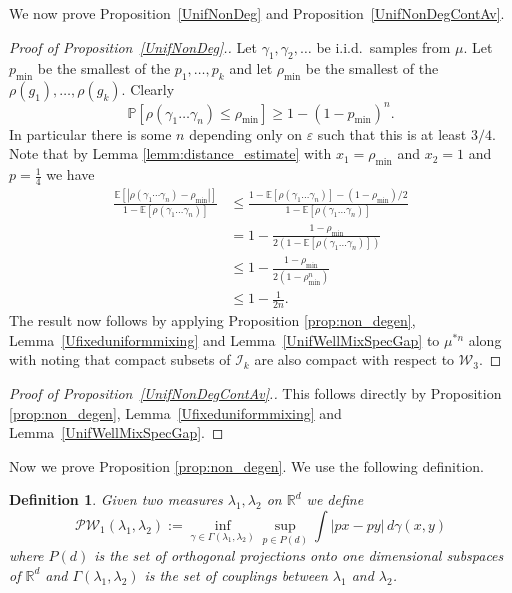 \documentclass[10pt, english,oneside,reqno]{amsart}
\theoremstyle{plain}
\newtheorem{definition}[theorem]{Definition}
\theoremstyle{remark}
\numberwithin{equation}{section}
\numberwithin{figure}{section}
\newcommand{\eps}{\varepsilon}
\newcommand{\R}{\mathbb{R}}
\begin{document}
We now prove Proposition~\ref{UnifNonDeg} and Proposition~\ref{UnifNonDegContAv}.

\begin{proof}[Proof of Proposition~\ref{UnifNonDeg}.]
	Let $\gamma_1, \gamma_2, \dots$ be i.i.d.\ samples from $\mu$. Let $p_{\text{min}}$ be the smallest of the $p_1, \dots, p_k$ and let $\rho_{\text{min}}$ be the smallest of the $\rho(g_1), \dots, \rho(g_k)$. Clearly
	\begin{equation*}
		\mathbb{P}[\rho(\gamma_1 \dots \gamma_n) \leq \rho_{\text{min}}] \geq 1 - (1 - p_{\text{min}})^n.
	\end{equation*}
	In particular there is some $n$ depending only on $\eps$ such that this is at least $3/4$. Note that by Lemma \ref{lemm:distance_estimate} with $x_1 = \rho_{\min}$ and $x_2 = 1$ and $p = \frac{1}{4}$ we have
	\begin{align*}
		\frac{\mathbb{E}[|\rho(\gamma_1 \cdots \gamma_n) - \rho_{\text{min}} |]}{1 - \mathbb{E}[\rho(\gamma_1 \dots \gamma_n)]} &\leq \frac{1 - \mathbb{E}[\rho(\gamma_1 \dots \gamma_n)] - (1 - \rho_{\text{min}}) / 2}{1 - \mathbb{E}[\rho(\gamma_1 \dots \gamma_n)]}\\
		&= 1 - \frac{1 - \rho_{\text{min}}}{2 (1 - \mathbb{E}[\rho(\gamma_1 \dots \gamma_n)])}\\
		& \leq 1 - \frac{1 - \rho_{\text{min}}}{2  (1 - \rho_{\text{min}}^n)} \\
		& \leq 1 - \frac{1}{2n}.
	\end{align*} The result now follows by applying Proposition \ref{prop:non_degen}, Lemma~\ref{Ufixeduniformmixing} and Lemma~\ref{UnifWellMixSpecGap} to $\mu^{*n}$ along with noting that compact subsets of $\mathcal{I}_k$ are also compact with respect to $\mathcal{W}_3$. 
\end{proof}

\begin{proof}[Proof of Proposition~\ref{UnifNonDegContAv}.]
	This follows directly by Proposition \ref{prop:non_degen}, Lemma~\ref{Ufixeduniformmixing} and Lemma~\ref{UnifWellMixSpecGap}.
\end{proof}

Now we prove Proposition \ref{prop:non_degen}. We use the following definition.

\begin{definition}
	Given two measures $\lambda_1, \lambda_2$ on $\R^d$ we define
	\begin{equation*}
		\mathcal{PW}_1(\lambda_1, \lambda_2) :=  \inf_{\gamma \in \Gamma(\lambda_1, \lambda_2)} \sup_{p \in P(d)} \int |px-py| \, d \gamma(x, y)
	\end{equation*}
	where $P(d)$ is the set of orthogonal projections onto one dimensional subspaces of $\R^d$ and $\Gamma(\lambda_1, \lambda_2)$ is the set of couplings between $\lambda_1$ and $\lambda_2$.
\end{definition}
\end{document}

